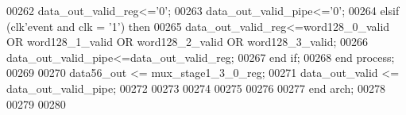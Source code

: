 \begin{DoxyCode}
00262             \textcolor{vhdlchar}{data_out_valid_reg}\textcolor{vhdlchar}{<=}\textcolor{vhdlchar}{'}\textcolor{vhdllogic}{}\textcolor{vhdllogic}{0}\textcolor{vhdlchar}{'};
00263          \textcolor{vhdlchar}{data_out_valid_pipe}\textcolor{vhdlchar}{<=}\textcolor{vhdlchar}{'}\textcolor{vhdllogic}{}\textcolor{vhdllogic}{0}\textcolor{vhdlchar}{'};
00264       \textcolor{keywordflow}{elsif} \textcolor{vhdlchar}{(}\textcolor{vhdlchar}{clk}\textcolor{vhdlchar}{'}\textcolor{vhdlkeyword}{event} \textcolor{keywordflow}{and} \textcolor{vhdlchar}{clk} \textcolor{vhdlchar}{=} \textcolor{vhdlchar}{'}\textcolor{vhdllogic}{}\textcolor{vhdllogic}{1}\textcolor{vhdlchar}{'}\textcolor{vhdlchar}{)} \textcolor{keywordflow}{then}
00265             \textcolor{vhdlchar}{data_out_valid_reg}\textcolor{vhdlchar}{<=}\textcolor{vhdlchar}{word128_0_valid} \textcolor{keywordflow}{OR} \textcolor{vhdlchar}{word128_1_valid} \textcolor{keywordflow}{OR} \textcolor{vhdlchar}{
      word128_2_valid} \textcolor{keywordflow}{OR} \textcolor{vhdlchar}{word128_3_valid};
00266          \textcolor{vhdlchar}{data_out_valid_pipe}\textcolor{vhdlchar}{<=}\textcolor{vhdlchar}{data_out_valid_reg}; 
00267         \textcolor{keywordflow}{end} \textcolor{keywordflow}{if};
00268     \textcolor{keywordflow}{end} \textcolor{keywordflow}{process};
00269     
00270     \textcolor{vhdlchar}{data56_out}         \textcolor{vhdlchar}{<=} \textcolor{vhdlchar}{mux_stage1_3_0_reg};
00271     \textcolor{vhdlchar}{data_out_valid}   \textcolor{vhdlchar}{<=} \textcolor{vhdlchar}{data_out_valid_pipe};
00272 
00273 
00274 
00275  
00276 
00277 \textcolor{keywordflow}{end} \textcolor{vhdlchar}{arch};   
00278 
00279 
00280 
\end{DoxyCode}
